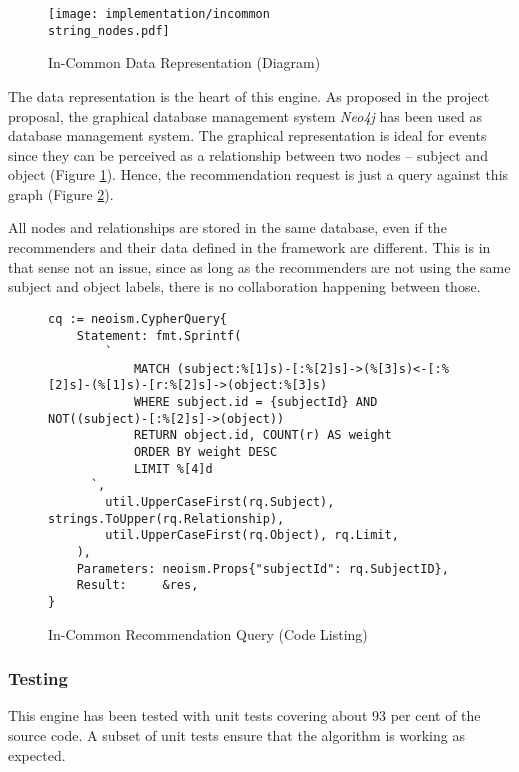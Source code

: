 \begin{figure}[ht]
    \texttt{[image: implementation/incommon\\string\_nodes.pdf]}
    \caption{In-Common Data Representation (Diagram)}
    \label{fig:implementation-incommon-nodes}
\end{figure}

The data representation is the heart of this engine. As proposed in the project proposal, the graphical database management system \emph{Neo4j} has been used as database management system. The graphical representation is ideal for events since they can be perceived as a relationship between two nodes -- subject and object (Figure \ref{fig:implementation-incommon-nodes}). Hence, the recommendation request is just a query against this graph (Figure \ref{fig:implementation-incommon-recommendation-query}).

All nodes and relationships are stored in the same database, even if the recommenders and their data defined in the framework are different. This is in that sense not an issue, since as long as the recommenders are not using the same subject and object labels, there is no collaboration happening between those.

\begin{figure}[!ht]
    \begin{verbatim}
cq := neoism.CypherQuery{
    Statement: fmt.Sprintf(
        `
            MATCH (subject:%[1]s)-[:%[2]s]->(%[3]s)<-[:%[2]s]-(%[1]s)-[r:%[2]s]->(object:%[3]s)
            WHERE subject.id = {subjectId} AND NOT((subject)-[:%[2]s]->(object))
            RETURN object.id, COUNT(r) AS weight
            ORDER BY weight DESC
            LIMIT %[4]d
      `,
        util.UpperCaseFirst(rq.Subject), strings.ToUpper(rq.Relationship),
        util.UpperCaseFirst(rq.Object), rq.Limit,
    ),
    Parameters: neoism.Props{"subjectId": rq.SubjectID},
    Result:     &res,
}
    \end{verbatim}
    \caption{In-Common Recommendation Query (Code Listing)}
    \label{fig:implementation-incommon-recommendation-query}
\end{figure}

\subsubsection{Testing}

This engine has been tested with unit tests covering about 93 per cent of the source code. A subset of unit tests ensure that the algorithm is working as expected.

